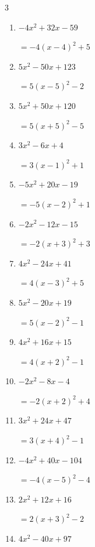 \begin{multicols}{3}
\begin{enumerate}
        $=-2\left( x+5\right)^{2}+5$

  \item $-4x^{2}+32x-59$

        $=-4\left( x-4\right)^{2}+5$

  \item $5x^{2}-50x+123$

        $=5\left( x-5\right)^{2}-2$

  \item $5x^{2}+50x+120$

        $=5\left( x+5\right)^{2}-5$

  \item $3x^{2}-6x+4$

        $=3\left( x-1\right)^{2}+1$

\columnbreak %

\resetques

  \item $-5x^{2}+20x-19$

        $=-5\left( x-2\right)^{2}+1$

  \item $-2x^{2}-12x-15$

        $=-2\left( x+3\right)^{2}+3$

  \item $4x^{2}-24x+41$

        $=4\left( x-3\right)^{2}+5$

  \item $5x^{2}-20x+19$

        $=5\left( x-2\right)^{2}-1$

  \item $4x^{2}+16x+15$

        $=4\left( x+2\right)^{2}-1$

  \item $-2x^{2}-8x-4$

        $=-2\left( x+2\right)^{2}+4$

  \item $3x^{2}+24x+47$

        $=3\left( x+4\right)^{2}-1$

  \item $-4x^{2}+40x-104$

        $=-4\left( x-5\right)^{2}-4$

  \item $2x^{2}+12x+16$

        $=2\left( x+3\right)^{2}-2$

  \item $4x^{2}-40x+97$


\end{enumerate}
\end{multicols}
